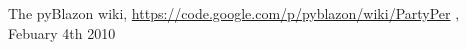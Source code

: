 \begin{thebibliography}{100}

  The pyBlazon wiki, 
  \url{https://code.google.com/p/pyblazon/wiki/PartyPer} , 
  Febuary 4th 2010




\end{thebibliography}